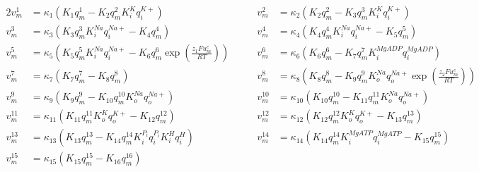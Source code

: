 \begin{alignat*}{2}
v_m^{1}  &= \kappa_1 \left( K_1 q_m^1 - K_2 q_m^2 K_i^{K} q_i^{K+} \right)
&\qquad
v_m^{2}  &= \kappa_2 \left( K_2 q_m^2 - K_3 q_m^3 K_i^{K} q_i^{K+} \right) \\[6pt]
v_m^{3}  &= \kappa_3 \left( K_3 q_m^3 K_i^{Na} q_i^{Na+} - K_4 q_m^4 \right)
&\qquad
v_m^{4}  &= \kappa_4 \left( K_4 q_m^4 K_i^{Na} q_i^{Na+} - K_5 q_m^5 \right) \\[6pt]
v_m^{5}  &= \kappa_5 \left( K_5 q_m^5 K_i^{Na} q_i^{Na+}
            - K_6 q_m^6 \exp\left( \frac{z_1 F u_m^e}{RT} \right) \right)
&\qquad
v_m^{6}  &= \kappa_6 \left( K_6 q_m^6 - K_7 q_m^7 K_i^{MgADP} q_i^{MgADP} \right) \\[6pt]
v_m^{7}  &= \kappa_7 \left( K_7 q_m^7 - K_8 q_m^8 \right)
&\qquad
v_m^{8}  &= \kappa_8 \left( K_8 q_m^8 - K_9 q_m^9 K_o^{Na} q_o^{Na+}
             \exp\left( \frac{z_2 F u_m^e}{RT} \right) \right) \\[6pt]
v_m^{9}  &= \kappa_9 \left( K_9 q_m^9 - K_{10} q_m^{10} K_o^{Na} q_o^{Na+} \right)
&\qquad
v_m^{10} &= \kappa_{10} \left( K_{10} q_m^{10} - K_{11} q_m^{11} K_o^{Na} q_o^{Na+} \right) \\[6pt]
v_m^{11} &= \kappa_{11} \left( K_{11} q_m^{11} K_o^{K} q_o^{K+} - K_{12} q_m^{12} \right)
&\qquad
v_m^{12} &= \kappa_{12} \left( K_{12} q_m^{12} K_o^{K} q_o^{K+} - K_{13} q_m^{13} \right) \\[6pt]
v_m^{13} &= \kappa_{13} \left( K_{13} q_m^{13}
             - K_{14} q_m^{14} K_i^{P_i} q_i^{P_i} K_i^{H} q_i^{H} \right)
&\qquad
v_m^{14} &= \kappa_{14} \left( K_{14} q_m^{14} K_i^{MgATP} q_i^{MgATP}
             - K_{15} q_m^{15} \right) \\[6pt]
v_m^{15} &= \kappa_{15} \left( K_{15} q_m^{15} - K_{16} q_m^{16} \right)
& &
\end{alignat*}
